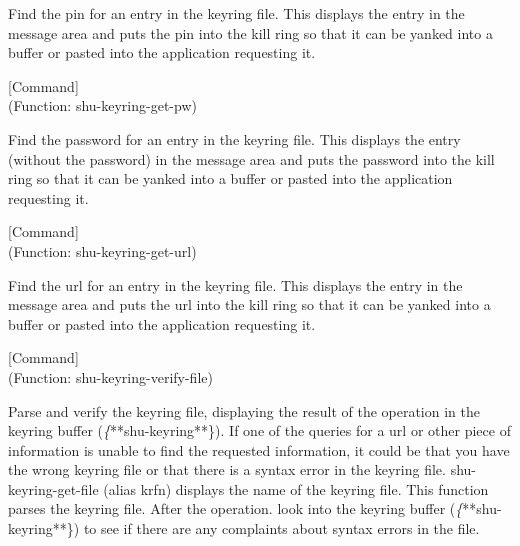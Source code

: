 \begin{doc-string}
Find the pin for an entry in the keyring file.  This displays the entry in
the message area and puts the pin into the kill ring so that it can be yanked
into a buffer or pasted into the application requesting it.
\end{doc-string}

\vspace{1em}
\noindent
{}
\usebox{\funcname}
 \hfill [Command]\\%
 (Function: shu-keyring-get-pw)

\begin{doc-string}
Find the password for an entry in the keyring file.  This displays the entry
(without the password) in the message area and puts the password into the kill
ring so that it can be yanked into a buffer or pasted into the application
requesting it.
\end{doc-string}

\vspace{1em}
\noindent
{}
\usebox{\funcname}
 \hfill [Command]\\%
 (Function: shu-keyring-get-url)

\begin{doc-string}
Find the url for an entry in the keyring file.  This displays the entry in
the message area and puts the url into the kill ring so that it can be yanked
into a buffer or pasted into the application requesting it.
\end{doc-string}

\vspace{1em}
\noindent
{}
\usebox{\funcname}
 \hfill [Command]\\%
 (Function: shu-keyring-verify-file)

\begin{doc-string}
Parse and verify the keyring file, displaying the result of the operation in the
keyring buffer (\emph\{**shu-keyring**\}).  If one of the queries for a url or other
piece of information is unable to find the requested information, it could be
that you have the wrong keyring file or that there is a syntax error in the
keyring file.  shu-keyring-get-file (alias krfn) displays the name of the
keyring file.  This function parses the keyring file.  After the operation. look
into the keyring buffer (\emph\{**shu-keyring**\}) to see if there are any complaints
about syntax errors in the file.
\end{doc-string}

